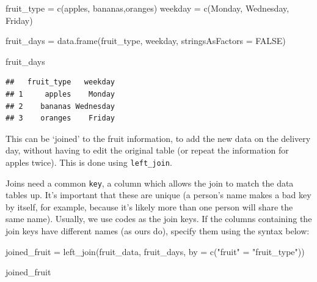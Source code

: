 \documentclass[
]{book}
\newenvironment{Shaded}{\begin{snugshade}}{\end{snugshade}}
\newcommand{\AttributeTok}[1]{\textcolor[rgb]{0.77,0.63,0.00}{#1}}
\newcommand{\ConstantTok}[1]{\textcolor[rgb]{0.00,0.00,0.00}{#1}}
\newcommand{\FunctionTok}[1]{\textcolor[rgb]{0.00,0.00,0.00}{#1}}
\newcommand{\NormalTok}[1]{#1}
\newcommand{\OtherTok}[1]{\textcolor[rgb]{0.56,0.35,0.01}{#1}}
\newcommand{\StringTok}[1]{\textcolor[rgb]{0.31,0.60,0.02}{#1}}
\begin{document}
\begin{Shaded}
\begin{Highlighting}[]
\NormalTok{fruit\_type }\OtherTok{=} \FunctionTok{c}\NormalTok{(}\StringTok{\textquotesingle{}apples\textquotesingle{}}\NormalTok{, }\StringTok{\textquotesingle{}bananas\textquotesingle{}}\NormalTok{,}\StringTok{\textquotesingle{}oranges\textquotesingle{}}\NormalTok{)}
\NormalTok{weekday }\OtherTok{=} \FunctionTok{c}\NormalTok{(}\StringTok{\textquotesingle{}Monday\textquotesingle{}}\NormalTok{, }\StringTok{\textquotesingle{}Wednesday\textquotesingle{}}\NormalTok{, }\StringTok{\textquotesingle{}Friday\textquotesingle{}}\NormalTok{)}

\NormalTok{fruit\_days }\OtherTok{=} \FunctionTok{data.frame}\NormalTok{(fruit\_type, weekday, }\AttributeTok{stringsAsFactors =} \ConstantTok{FALSE}\NormalTok{)}

\NormalTok{fruit\_days}
\end{Highlighting}
\end{Shaded}

\begin{verbatim}
##   fruit_type   weekday
## 1     apples    Monday
## 2    bananas Wednesday
## 3    oranges    Friday
\end{verbatim}

This can be `joined' to the fruit information, to add the new data on the delivery day, without having to edit the original table (or repeat the information for apples twice). This is done using \texttt{left\_join}.

Joins need a common \texttt{key}, a column which allows the join to match the data tables up. It's important that these are unique (a person's name makes a bad key by itself, for example, because it's likely more than one person will share the same name). Usually, we use codes as the join keys. If the columns containing the join keys have different names (as ours do), specify them using the syntax below:

\begin{Shaded}
\begin{Highlighting}[]
\NormalTok{joined\_fruit }\OtherTok{=} \FunctionTok{left\_join}\NormalTok{(fruit\_data, fruit\_days, }\AttributeTok{by =} \FunctionTok{c}\NormalTok{(}\StringTok{"fruit"} \OtherTok{=} \StringTok{"fruit\_type"}\NormalTok{))}

\NormalTok{joined\_fruit}
\end{Highlighting}
\end{Shaded}
\end{document}

